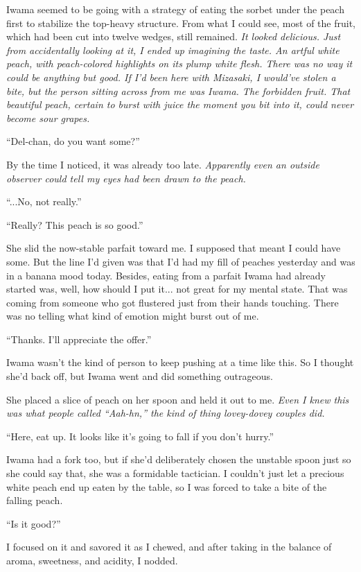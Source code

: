 \documentclass[
    a4paper,
    12pt,
    twoside,
    openany,
    UTF8,
    fontset=windows
]{ctexbook}
\begin{document}
Iwama seemed to be going with a strategy of eating the sorbet under the peach first to stabilize the top-heavy structure. From what I could see, most of the fruit, which had been cut into twelve wedges, still remained. \textit{It looked delicious. Just from accidentally looking at it, I ended up imagining the taste. An artful white peach, with peach-colored highlights on its plump white flesh. There was no way it could be anything but good. If I'd been here with Mizasaki, I would've stolen a bite, but the person sitting across from me was Iwama. The forbidden fruit. That beautiful peach, certain to burst with juice the moment you bit into it, could never become sour grapes.}

``Del-chan, do you want some?''

By the time I noticed, it was already too late. \textit{Apparently even an outside observer could tell my eyes had been drawn to the peach.}

``...No, not really.''

``Really? This peach is so good.''

She slid the now-stable parfait toward me. I supposed that meant I could have some. But the line I'd given was that I'd had my fill of peaches yesterday and was in a banana mood today. Besides, eating from a parfait Iwama had already started was, well, how should I put it... not great for my mental state. That was coming from someone who got flustered just from their hands touching. There was no telling what kind of emotion might burst out of me.

``Thanks. I'll appreciate the offer.''

Iwama wasn't the kind of person to keep pushing at a time like this. So I thought she'd back off, but Iwama went and did something outrageous.

She placed a slice of peach on her spoon and held it out to me. \textit{Even I knew this was what people called ``Aah-hn,'' the kind of thing lovey-dovey couples did.}

``Here, eat up. It looks like it's going to fall if you don't hurry.''

Iwama had a fork too, but if she'd deliberately chosen the unstable spoon just so she could say that, she was a formidable tactician. I couldn't just let a precious white peach end up eaten by the table, so I was forced to take a bite of the falling peach.

``Is it good?''

I focused on it and savored it as I chewed, and after taking in the balance of aroma, sweetness, and acidity, I nodded.
\end{document}
